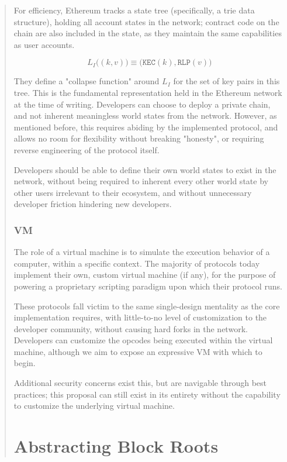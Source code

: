 \documentclass[12pt, titlepage, twocolumn]{report}
\begin{document}
\begin{quotation}
For efficiency, Ethereum tracks a state tree (specifically, a trie data structure), holding all account states in the network; contract code on the chain are also included in the state, as they maintain the same capabilities as user accounts. 

\begin{equation}
L_{I}\big( (k, v) \big) \equiv \big(\texttt{KEC}(k), \texttt{RLP}(v)\big)
\end{equation}

They define a "collapse function" around \(L_{I}\) for the set of key pairs in this tree. This is the fundamental representation held in the Ethereum network at the time of writing.
Developers can choose to deploy a private chain, and not inherent meaningless world states from the network. However, as mentioned before, this requires abiding by the implemented protocol, and allows no room for flexibility without breaking "honesty", or requiring reverse engineering of the protocol itself.

Developers should be able to define their own world states to exist in the network, without being required to inherent every other world state by other users irrelevant to their ecosystem, and without unnecessary developer friction hindering new developers.


\subsection{VM}

The role of a virtual machine is to simulate the execution behavior of a computer, within a specific context. The majority of protocols today implement their own, custom virtual machine (if any), for the purpose of powering a proprietary scripting paradigm upon which their protocol runs. 

These protocols fall victim to the same single-design mentality as the core implementation requires, with little-to-no level of customization to the developer community, without causing hard forks in the network. Developers can customize the opcodes being executed within the virtual machine, although we aim to expose an expressive VM with which to begin. 

Additional security concerns exist this, but are navigable through best practices; this proposal can still exist in its entirety without the capability to customize the underlying virtual machine.


\chapter{Abstracting Block Roots}


\end{quotation}
\end{document}
